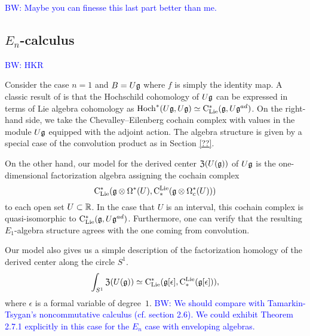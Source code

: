 \documentclass[11pt]{amsart}
\numberwithin{equation}{section}
\def\brian{\textcolor{blue}{BW: }\textcolor{blue}}
\begin{document}
\brian{Maybe you can finesse this last part better than me.}

%
%

\subsection{$E_n$-calculus}
\label{sec: TT}

\brian{HKR}

Consider the case $n=1$ and $B = U \mathfrak g$ where $f$ is simply the identity map. 
A classic result of \cite{HochSerre} is that the Hochschild cohomology of $U \mathfrak g$ can be expressed in terms of Lie algebra cohomology as ${\rm Hoch}^*(U\mathfrak g,U\mathfrak g) \simeq {\rm C}_{\rm Lie}^*(\mathfrak g, U\mathfrak g^{ad})$. 
On the right-hand side, we take the Chevalley--Eilenberg cochain complex with values in the module $U \mathfrak g$ equipped with the adjoint action.
The algebra structure is given by a special case of the convolution product as in Section \ref{??}. 

On the other hand, our model for the derived center ${\frak Z}(U(\mathfrak g))$ of $U \mathfrak g$ is the one-dimensional factorization algebra assigning the cochain complex
\[
{\rm C}_{\rm Lie}^*(\mathfrak g \otimes \Omega^*(U), {\rm C}^{\rm Lie}_*( \mathfrak g \otimes \Omega^*_c(U)))
\]
to each open set $U \subset \mathbb R$.
In the case that $U$ is an interval, this cochain complex is quasi-isomorphic to ${\rm C}_{\rm Lie}^* (\mathfrak g , U\mathfrak g^{ad})$.
Furthermore, one can verify that the resulting $E_1$-algebra structure agrees with the one coming from convolution. 

Our model also gives us a simple description of the factorization homology of the derived center along the circle $S^1$.
\[
\int_{S^1} {\frak Z}(U(\mathfrak g)) \simeq {\rm C}_{\rm Lie}^*(\mathfrak g[\epsilon], {\rm C}^{\rm Lie}_*( \mathfrak g[\epsilon])),
\]
where $\epsilon$ is a formal variable of degree~$1$. 
\brian{We should compare with Tamarkin-Tsygan's noncommutative calculus (cf. section 2.6).
We could exhibit Theorem 2.7.1 explicitly in this case for the $E_n$ case with enveloping algebras.}
\end{document}
